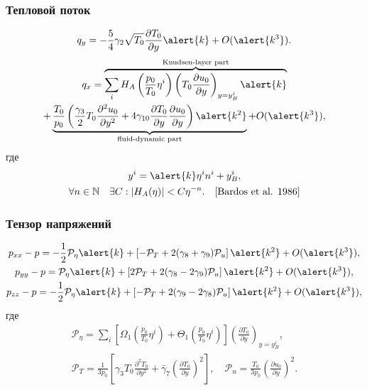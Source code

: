 \documentclass[mathserif]{beamer} %
\newcommand{\pder}[2][]{\frac{\partial#1}{\partial#2}}
\newcommand{\pderdual}[2][]{\frac{\partial^2#1}{\partial#2^2}}
\newcommand{\OO}[1]{O(#1)}
\begin{document}
\begin{frame}
    \frametitle{Тепловой поток}
    \begin{equation}\label{eq:Hilbert_Qy}
        q_y = -\frac54\gamma_2\sqrt{T_0}\pder[T_0]{y}\alert{k} + \OO{\alert{k^3}}.
    \end{equation}
    \pause
    \begin{multline}
        q_x = \overbrace{\sum_i H_A\left(\frac{p_0}{T_0}\eta^i\right)\left(T_0\pder[u_0]{y}\right)_{y=y_B^i}\alert{k}}
            ^\text{Knudsen-layer part} \\
            + \underbrace{\frac{T_0}{p_0}\left(\frac{\gamma_3}2 T_0 \pderdual[u_0]{y}
            + 4\gamma_{10} \pder[T_0]{y}\pder[u_0]{y}\right)\alert{k^2}}
            _\text{fluid-dynamic part} + \OO{\alert{k^3}}, \label{eq:Hilbert_Qx}
    \end{multline}
    где
    \begin{gather}
        y^i = \alert{k}\eta^i n^i + y_B^i, \label{eq:knudsen_layer_coordinates}\\
        \forall n\in\mathbb{N} \quad \exists C: |H_A(\eta)| < C\eta^{-n}. \quad \text{[Bardos et al. 1986]}
    \end{gather}
\end{frame}

\begin{frame}
    \frametitle{Тензор напряжений}
    \begin{gather}
        p_{xx} - p = -\frac12\mathcal{P}_\eta \alert{k}
            + \left[-\mathcal{P}_T + 2(\gamma_8+\gamma_9)\mathcal{P}_u\right]\alert{k^2}
            + \OO{\alert{k^3}}, \label{eq:Hilbert_Pxx}\\
        p_{yy} - p = \mathcal{P}_\eta \alert{k}
            + \left[2\mathcal{P}_T + 2(\gamma_8-2\gamma_9)\mathcal{P}_u\right]\alert{k^2}
            + \OO{\alert{k^3}}, \label{eq:Hilbert_Pyy}\\
        p_{zz} - p = -\frac12\mathcal{P}_\eta \alert{k}
            + \left[-\mathcal{P}_T + 2(\gamma_9-2\gamma_8)\mathcal{P}_u\right]\alert{k^2}
            + \OO{\alert{k^3}}, \label{eq:Hilbert_Pzz}
    \end{gather}
    где
    \begin{gather}\label{eq:mathcal_P_def}
        \mathcal{P}_\eta = \sum_i \left[\Omega_1\left(\frac{p_0}{T_0}\eta^i\right)
            + \Theta_1\left(\frac{p_0}{T_0}\eta^i\right)\right]\left(\pder[T_0]{y}\right)_{y=y_B^i}, \\
        \mathcal{P}_T = \frac1{3p_0}\left[\gamma_3 T_0 \pderdual[T_0]{y} + \bar{\gamma}_7\left(\pder[T_0]{y}\right)^2\right], \quad
        \mathcal{P}_u = \frac{T_0}{3p_0}\left(\pder[u_0]{y}\right)^2.
    \end{gather}
\end{frame}
\end{document}
